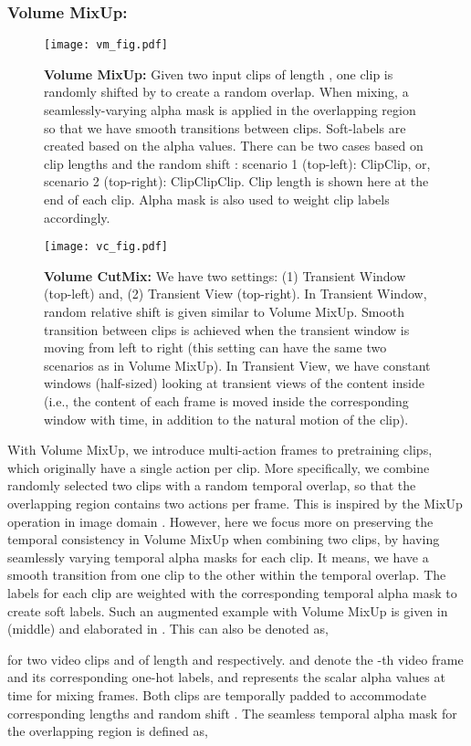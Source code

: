 \documentclass[letterpaper]{article} \usepackage{aaai23}  \usepackage{times}  \usepackage{helvet}  \usepackage{courier}  \usepackage[hyphens]{url}  \usepackage{graphicx} \urlstyle{rm} \def\UrlFont{\rm}  \usepackage{natbib}  \usepackage{caption} \frenchspacing  \setlength{\pdfpagewidth}{8.5in}  \setlength{\pdfpageheight}{11in}  \usepackage{algorithm}
\newcommand{\ch}{}
\begin{document}
\subsubsection{Volume MixUp:}
\label{subsec:mu}

\begin{figure*}[t]
	\centering
	\texttt{[image: vm\_fig.pdf]}
	\caption{\textbf{Volume MixUp:} Given two input clips of length , one clip is randomly shifted by  to create a random overlap. When mixing, a seamlessly-varying alpha mask is applied in the overlapping region so that we have smooth transitions between clips. Soft-labels are created based on the alpha values. There can be two cases based on clip lengths  and the random shift : scenario 1 (top-left): ClipClip, or, scenario 2 (top-right): ClipClipClip. Clip length is shown here at the end of each clip. \ch{Alpha mask is also used to weight clip labels accordingly.}}
	\label{fig:vm}
\end{figure*}

\begin{figure*}[t]
	\centering
	\texttt{[image: vc\_fig.pdf]}
	\caption{\textbf{Volume CutMix:} We have two settings: (1) Transient Window (top-left) and, (2) Transient View (top-right). In Transient Window, random relative shift  is given similar to Volume MixUp. Smooth transition between clips is achieved when the transient window is moving from left to right (this setting can have the same two scenarios as in Volume MixUp). In Transient View, we have constant windows (half-sized) looking at transient views of the content inside (i.e., the content of each frame is moved inside the corresponding window with time, in addition to the natural motion of the clip). }
	\label{fig:vc}
\end{figure*}

With Volume MixUp, we introduce multi-action frames to pretraining clips, which originally have a single action per clip. More specifically, we combine randomly selected two clips with a random temporal overlap, so that the overlapping region contains two actions per frame. This is inspired by the MixUp operation in image domain \cite{zhang2017mixup}. However, here we focus more on preserving the temporal consistency in Volume MixUp when combining two clips, by having seamlessly varying temporal alpha masks for each clip. It means, we have a smooth transition from one clip to the other within the temporal overlap. The labels for each clip are weighted with the corresponding temporal alpha mask to create soft labels. Such an augmented example with Volume MixUp is given in  (middle) and elaborated in . This can also be denoted as,
{\small

}for two video clips  and  of length  and  respectively.  and  denote the -th video frame and its corresponding one-hot labels, and  represents the scalar alpha values at time  for mixing frames. Both clips are temporally padded to accommodate corresponding lengths  and random shift . \ch{The seamless temporal alpha mask for the overlapping region is defined as,}
{\small

}
\end{document}
